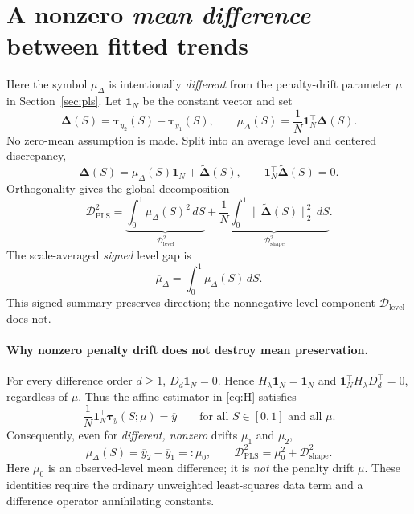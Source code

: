 \documentclass[10pt,letterpaper]{article}
\begin{document}
\section{A nonzero \emph{mean difference} between fitted trends}
\label{sec:mean}
Here the symbol $\mu_\Delta$ is intentionally \emph{different} from
the penalty-drift parameter $\mu$ in Section~\ref{sec:pls}.
Let $\bm 1_N$ be the constant vector and set
\begin{equation}\label{eq:mean_delta}
\bm\Delta(S)=\bm\tau_{y_2}(S)-\bm\tau_{y_1}(S),\qquad
\mu_\Delta(S)=\frac1N\bm{1}_N^\top\bm\Delta(S).
\end{equation}
No zero-mean assumption is made. Split into an average level
and centered discrepancy,
\begin{equation}\label{eq:centered_delta}
 \bm\Delta(S)=\mu_\Delta(S)\bm{1}_N+
 \widetilde{\bm\Delta}(S),\qquad
 \bm{1}_N^\top\widetilde{\bm\Delta}(S)=0.
\end{equation}
Orthogonality gives the global decomposition
\begin{equation}\label{eq:mean_shape_global}
\mathcal D_{\mathrm{PLS}}^2
 =\underbrace{\int_0^1\mu_\Delta(S)^2\,dS}_{\mathcal D_{\mathrm{level}}^2}
 +\underbrace{\frac1N\int_0^1\|\widetilde{\bm\Delta}(S)\|_2^2\,dS}_{\mathcal D_{\mathrm{shape}}^2}.
\end{equation}
The scale-averaged \emph{signed} level gap is
\begin{equation}\label{eq:signed_global_mean}
\overline\mu_\Delta=\int_0^1\mu_\Delta(S)\,dS.
\end{equation}
This signed summary preserves direction; the nonnegative level
component $\mathcal D_{\mathrm{level}}$ does not.

\paragraph{Why nonzero penalty drift does not destroy mean preservation.}
For every difference order $d\ge1$, $D_d\bm{1}_N=0$. Hence
$H_\lambda\bm{1}_N=\bm{1}_N$ and
$\bm{1}_N^\top H_\lambda D_d^\top=0$, regardless of $\mu$.
Thus the affine estimator in \eqref{eq:H} satisfies
\begin{equation}\label{eq:mean_preservation}
 \frac1N\bm{1}_N^\top\bm\tau_y(S;\mu)=\overline y
 \qquad\text{for all }S\in[0,1]\text{ and all }\mu.
\end{equation}
Consequently, even for \emph{different, nonzero} drifts $\mu_1$
and $\mu_2$,
\begin{equation}\label{eq:constant_mean_gap}
 \mu_\Delta(S)=\overline y_2-\overline y_1=:\mu_0,
 \qquad \mathcal D_{\mathrm{PLS}}^2=\mu_0^2+\mathcal D_{\mathrm{shape}}^2.
\end{equation}
Here $\mu_0$ is an observed-level mean difference; it is \emph{not}
the penalty drift $\mu$. These identities require the ordinary
unweighted least-squares data term and a difference operator
annihilating constants.
\end{document}
